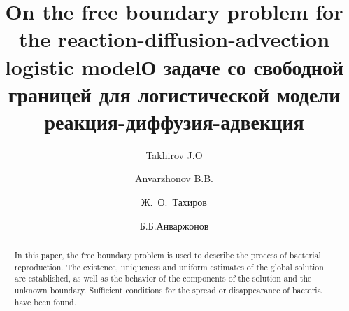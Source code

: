 \begin{englishtitle} %
\title{On the free boundary problem for the reaction-diffusion-advection logistic model}
\author{Takhirov J.O   \and  Anvarzhonov B.B.
}

\maketitle

\begin{abstract}
In this paper, the free boundary problem is used to describe the process of bacterial reproduction. The existence, uniqueness and uniform estimates of the global solution are established, as well as the behavior of the components of the solution and the unknown boundary. Sufficient conditions for the spread or disappearance of bacteria have been found.

\end{abstract}
\end{englishtitle}

\iffalse
%
%


\documentclass[12pt]{llncs}


\usepackage{iftex}

\ifPDFTeX
\usepackage[T2A]{fontenc}
\usepackage[utf8]{inputenc} %
\usepackage[english,russian]{babel}
\fi

\usepackage{todonotes}

\usepackage[russian]{nla}


\fi

\title{О задаче со свободной границей для логистической модели реакция-диффузия-адвекция}
\author{Ж.~О.~Тахиров \and Б.Б.Анваржонов
}

